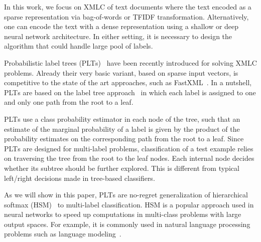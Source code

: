 \documentclass{article}
\newcommand{\Algo}[1]{\textsc{#1}}
\begin{document}
In this work, we focus on XMLC of text documents where the text
encoded as a sparse representation via bag-of-words or TFIDF
transformation. Alternatively, one can encode the text with a dense
representation using a shallow or deep neural network architecture.
In either setting, it is necessary to design the algorithm that could
handle large pool of labels.
%

Probabilistic label trees (\Algo{PLT}s)~\citep{Jasinska_et_al_2016}
have been recently introduced for solving XMLC problems. Already their
very basic variant, based on sparse input vectors, is competitive to
the state of the art approaches, such as
FastXML~\citep{Prabhu_Varma_2014}. In a nutshell, \Algo{PLT}s are
based on the label tree
approach~\cite{Beygelzimer_et_al_2009a,Bengio_et_al_2010,Deng_et_al_2011}
in which each label is assigned to one and only one path from the root
to a leaf.

\Algo{PLT}s use a class probability estimator in each node of the tree, such that an estimate of the marginal probability of a label is given by the product of the probability estimates on the corresponding path from the root to a leaf.  Since \Algo{PLT}s are designed for multi-label problems, classification of a test example relies on traversing the tree from the root to the leaf nodes. Each internal node decides whether its subtree should be further explored. This is different from typical left/right decisions made in tree-based classifiers. 

%

As we will show in this paper, \Algo{PLT}s are no-regret generalization of hierarchical softmax (HSM)~\citep{Morin_Bengio_2005} to multi-label classification. HSM is a popular approach used in neural networks to speed up computations in multi-class problems with large output spaces. For example, it is commonly used in natural language processing problems such as language modeling~\citep{Mikolov_et_al_2013}.  
\end{document}
